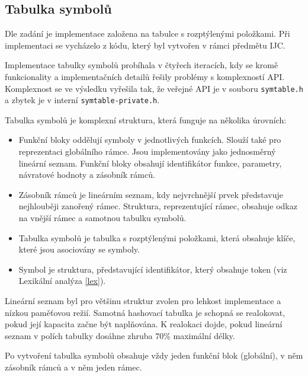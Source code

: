 \documentclass[12pt]{article}
\begin{document}
        \subsection{Tabulka symbolů} 
            Dle zadání je implementace založena na tabulce s rozptýlenými položkami. Při implementaci se vycházelo z kódu, který byl vytvořen v rámci předmětu IJC.
            
            Implementace tabulky symbolů probíhala v čtyřech iteracích, kdy se kromě funkcionality a implementačních
            detailů řešily problémy s komplexností API. Komplexnost se ve výsledku vyřešila tak, že veřejné API je v
            souboru \break \texttt{symtable.h} a zbytek je v interní \texttt{symtable-private.h}.

            Tabulka symbolů je komplexní struktura, která funguje na několika úrovních:
            \begin{itemize}
            \setlength\itemsep{0.05em}
            \item Funkční bloky oddělují symboly v jednotlivých funkcích. Slouží také pro reprezentaci globálního rámce. Jsou
            implementovány jako jednosměrný lineá\-rní seznam. Funkční bloky obsahují identifikátor funkce, parametry,
            návrato\-vé hodnoty a zásobník rámců.

            \item Zásobník rámců je lineárním seznam, kdy nejvrchnější prvek představuje nejhlouběji zanořený rámec.
            Struktura, reprezentující rámec, obsahuje odkaz na vnější rámec a samotnou tabulku symbolů.

            \item Tabulka symbolů je tabulka s rozptýlenými položkami, která obsahuje klíče, které jsou asociovány se symboly.

            \item Symbol je struktura, představující identifikátor, který obsahuje token (viz Lexikální analýza \ref{lex}).
            \end{itemize}
            Lineární seznam byl pro většinu struktur zvolen pro lehkost implementace a níz\-kou paměťovou režií. Samotná
            hashovací tabulka je schopná se realokovat, pokud její kapacita začne být naplňována. K realokaci dojde, pokud
            lineární seznam v polích tabulky dosáhne zhruba 70\% maximální   délky.

            Po vytvoření tabulka symbolů obsahuje vždy jeden funkční blok (globální), v něm zásobník rámců a v něm jeden
            rámec.
\end{document}
